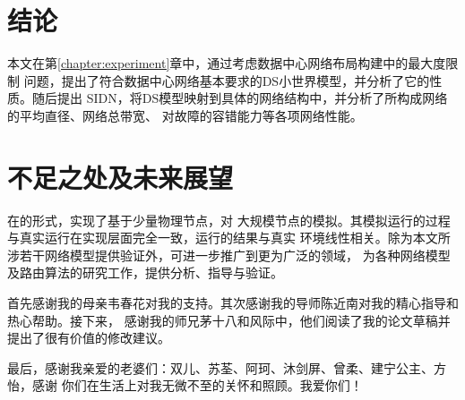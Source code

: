 \documentclass[bachelor,fandolfonts,replaceperiod]{jnuthesis}
\begin{document}
    \section{结论}
    本文在第\ref{chapter:experiment}章中，通过考虑数据中心网络布局构建中的最大度限制
    问题，提出了符合数据中心网络基本要求的DS小世界模型，并分析了它的性质。随后提出
    SIDN，将DS模型映射到具体的网络结构中，并分析了所构成网络的平均直径、网络总带宽、
    对故障的容错能力等各项网络性能。
    
    \zhlipsum[1-3]
    
    \section{不足之处及未来展望}
    在的形式，实现了基于少量物理节点，对
    大规模节点的模拟。其模拟运行的过程与真实运行在实现层面完全一致，运行的结果与真实
    环境线性相关。除为本文所涉若干网络模型提供验证外，可进一步推广到更为广泛的领域，
    为各种网络模型及路由算法的研究工作，提供分析、指导与验证。
    
    \begin{backmatter}
    
    \end{backmatter}

    \begin{acknowledgement}
        首先感谢我的母亲韦春花对我的支持。其次感谢我的导师陈近南对我的精心指导和热心帮助。接下来，
        感谢我的师兄茅十八和风际中，他们阅读了我的论文草稿并提出了很有价值的修改建议。
        
        最后，感谢我亲爱的老婆们：双儿、苏荃、阿珂、沐剑屏、曾柔、建宁公主、方怡，感谢
        你们在生活上对我无微不至的关怀和照顾。我爱你们！
    \end{acknowledgement}
    
\end{document}
